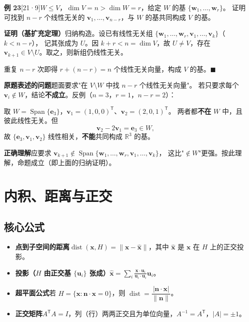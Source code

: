 \documentclass[10pt]{ctexart}
\newcommand{\Rr}{\mathbb{R}}
\newcommand{\Span}{\operatorname{Span}}
\newcommand{\TT}{^{\mathsf T}}
\newcommand{\y}[1]{\textcolor{y21}{[21·#1]}}
\begin{document}
\medskip
\textbf{例 23}\y{9}\quad $W\le V$，$\dim V=n>\dim W=r$，给定 $W$ 的基 $\{\mathbf w_1,\dots,\mathbf w_r\}$。
证明可找到 $n-r$ 个线性无关的 $\mathbf v_1,\dots,\mathbf v_{n-r}$，与 $W$ 的基共同构成 $V$ 的基。

\textbf{证明（基扩充定理）}\quad 归纳构造。设已有线性无关组 $\{\mathbf w_1,\dots,\mathbf w_r,\mathbf v_1,\dots,\mathbf v_k\}$（$k<n-r$），
记其张成为 $U$。因 $k+r<n=\dim V$，故 $U\ne V$，存在 $\mathbf v_{k+1}\in V\setminus U$。取之，则新组仍线性无关。

重复 $n-r$ 次即得 $r+(n-r)=n$ 个线性无关向量，构成 $V$ 的基。$\blacksquare$

\begin{warnbox}
\textbf{原题表述的问题}\quad 题面要求"在 $V\setminus W$ 中找 $n-r$ 个线性无关向量"。
若只要求每个 $\mathbf v_i\notin W$，结论\textbf{不成立}。反例（$n=3$，$r=1$，$n-r=2$）：

取 $W=\Span\{\mathbf e_3\}$，$\mathbf v_1=(1,0,0)\TT$、$\mathbf v_2=(2,0,1)\TT$。
两者都\textbf{不在} $W$ 中，且彼此线性无关。但
\[
\mathbf v_2-2\mathbf v_1=\mathbf e_3\in W ,
\]
故 $\{\mathbf e_3,\mathbf v_1,\mathbf v_2\}$ 线性相关，\textbf{不能}共同构成 $\Rr^3$ 的基。

\textbf{正确理解}\quad 应要求 $\mathbf v_{k+1}\notin\Span\{\mathbf w_1,\dots,\mathbf w_r,\mathbf v_1,\dots,\mathbf v_k\}$，
这比"$\notin W$"更强。按此理解，命题成立（即上面的归纳证明）。
\end{warnbox}

\section{内积、距离与正交}

\subsection{核心公式}

\begin{itemize}
\item \textbf{点到子空间的距离}\quad $\operatorname{dist}(\mathbf x,H)=\lVert\mathbf x-\hat{\mathbf x}\rVert$，其中 $\hat{\mathbf x}$ 是 $\mathbf x$ 在 $H$ 上的正交投影。
\item \textbf{投影（$H$ 由正交基 $\{\mathbf u_i\}$ 张成）}\quad $\hat{\mathbf x}=\sum_i\frac{\mathbf x\cdot\mathbf u_i}{\mathbf u_i\cdot\mathbf u_i}\mathbf u_i$。
\item \textbf{超平面公式}\quad 若 $H=\{\mathbf x:\mathbf n\cdot\mathbf x=0\}$，则 $\operatorname{dist}=\dfrac{\lvert\mathbf n\cdot\mathbf x\rvert}{\lVert\mathbf n\rVert}$。
\item \textbf{正交矩阵}\quad $A\TT A=I$，列（行）两两正交且为单位向量，$A^{-1}=A\TT$，$|A|=\pm1$。
\end{itemize}
\end{document}
